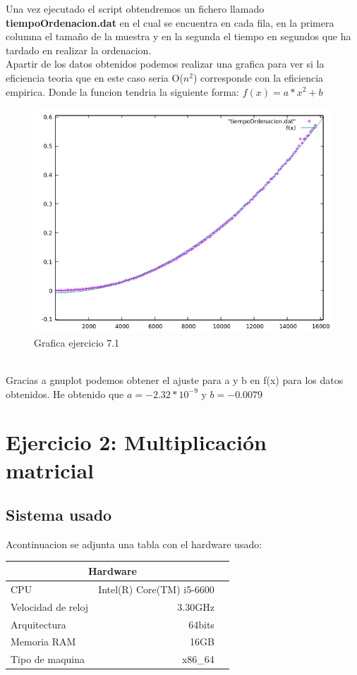 \documentclass[12pt,a4psprt]{article}
\begin{document}
Una vez ejecutado el script obtendremos un fichero llamado \textbf{tiempoOrdenacion.dat} en el cual se encuentra en cada fila, en la primera columna el tamaño de la muestra y en la segunda el tiempo en segundos que ha tardado en realizar la ordenacion.
\pagebreak
\\
Apartir de los datos obtenidos  podemos realizar una grafica para ver si la eficiencia teoria que en este caso seria O($n^{2}$) corresponde con la eficiencia empirica. Donde la funcion tendria la siguiente forma: \textbf{$f(x)=a*x^{2}+b $}
\begin{figure}[h]
\begin{center}
	\includegraphics[scale=1]{image/grafica_7_1.png}
\end{center}
\caption{Grafica ejercicio 7.1}

\end{figure}
\\
Gracias a gnuplot podemos obtener el ajuste para a y b en f(x) para los datos obtenidos.
He obtenido que $a=-2.32*10^{-9}$ y $b=-0.0079$
\section{Ejercicio 2: Multiplicación matricial}
\subsection{Sistema usado}
Acontinuacion se adjunta una tabla con el hardware usado: \\
\begin{center}
\begin{tabular}{|l||r|p{2cm}}
\hline
\multicolumn{2}{|c|}{Hardware} \\
\hline
CPU & Intel(R) Core(TM) i5-6600 \\
\hline
Velocidad de reloj & 3.30GHz \\
\hline
Arquitectura & 64bits \\
\hline
Memoria RAM & 16GB \\
\hline
Tipo de maquina & x86\_64 \\
\hline

\end{tabular}
\end{center}
\end{document}
